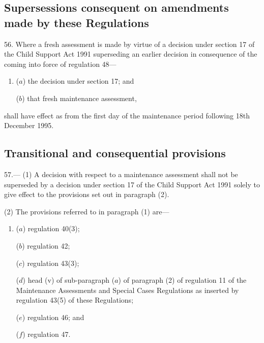 \documentclass[12pt,a4paper]{article}
\begin{document}
\subsection[56. Supersessions consequent on amendments made by these Regulations]{\sloppy Supersessions consequent on amendments made by these Regulations}

56.  Where a fresh assessment is made by virtue of a decision under section 17 of the Child Support Act 1991 superseding an earlier decision in consequence of the coming into force of regulation 48—
\begin{enumerate}\item[]
($a$) the decision under section 17; and

($b$) that fresh maintenance assessment,
\end{enumerate}
shall have effect as from the first day of the maintenance period following 18th December 1995.


\subsection[57. Transitional and consequential provisions]{Transitional and consequential provisions}

57.—%
%
(1) A decision with respect to a maintenance assessment shall not be superseded by a decision under section 17 of the Child Support Act 1991 solely to give effect to the provisions set out in paragraph (2).

(2) The provisions referred to in paragraph (1) are—
\begin{enumerate}\item[]
($a$) regulation 40(3);

($b$) regulation 42;

($c$) regulation 43(3);

($d$) head (v) of sub-paragraph ($a$) of paragraph (2) of regulation 11 of the Maintenance Assessments and Special Cases Regulations as inserted by regulation 43(5) of these Regulations;

($e$) regulation 46; and

($f$) regulation 47.
\end{enumerate}
\end{document}
